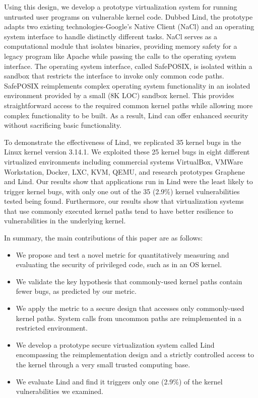 Using this design, we develop a prototype virtualization system for
running untrusted user programs on vulnerable kernel code. Dubbed Lind, the
prototype adapts two existing technologies-Google's Native Client (NaCl) and
an operating system interface
to handle distinctly different tasks. NaCl serves as a computational
module that isolates binaries, providing memory safety for a legacy program like
Apache while passing the calls to the operating system interface.  
The operating system interface, called SafePOSIX,
is isolated within a sandbox that restricts the interface to invoke only common code paths.
SafePOSIX reimplements complex operating system functionality in an isolated
environment provided by a small (8K LOC) sandbox kernel. This provides
straightforward access to the required common kernel paths while allowing more
complex functionality to be built.
As a result, Lind can offer enhanced security without sacrificing basic functionality.

To demonstrate the effectiveness of Lind, we replicated 35 kernel bugs in the Linux kernel
version 3.14.1. We exploited these 25 kernel bugs %
in eight different virtualized environments including
commercial systems VirtualBox, VMWare Workstation, Docker, LXC,
KVM, QEMU, and research prototypes Graphene and Lind. Our results show
that applications run in Lind were the least likely to trigger kernel bugs,
with only one out of the 35 (2.9\%) kernel vulnerabilities tested being found.
Furthermore, our results show that virtualization systems that use commonly 
executed kernel paths tend to have better resilience to vulnerabilities
in the underlying kernel.  

In summary, the main contributions of this paper are as follows:

\begin{itemize}\setlength\itemsep{0em}
\item
We propose and test a novel metric for quantitatively measuring and evaluating
the security of privileged code, such as in an OS kernel.

\item
We validate the key hypothesis that commonly-used kernel paths contain fewer bugs,
as predicted by our metric.

\item
We apply the metric to a secure design that accesses only commonly-used
kernel paths. System calls from uncommon paths are reimplemented in a
restricted environment.

\item
We develop a prototype secure virtualization system called Lind encompassing
the reimplementation design and a strictly controlled access to the kernel
through a very small trusted computing base.

\item
We evaluate Lind and find it triggers only one (2.9\%) of the kernel vulnerabilities
we examined.
\end{itemize}

